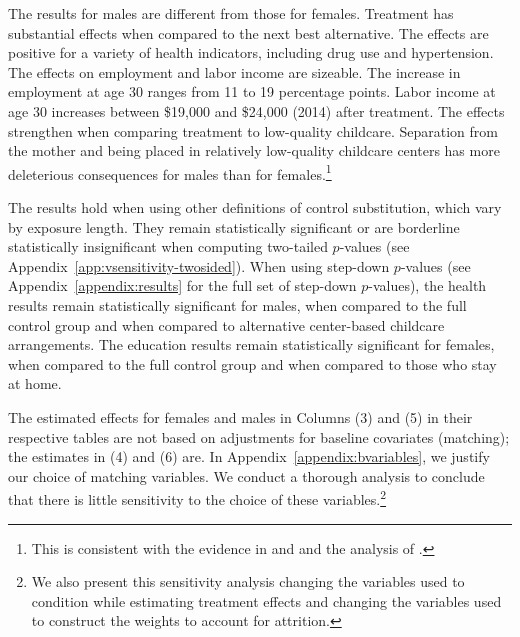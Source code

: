 The results for males are different from those for females. Treatment has substantial effects when compared to the next best alternative. The effects are positive for a variety of health indicators, including drug use and hypertension. The effects on employment and labor income are sizeable. The increase in employment at age 30 ranges from 11 to 19 percentage points. Labor income at age 30 increases between \$19,000 and \$24,000 (2014) after treatment. The effects strengthen when comparing treatment to low-quality childcare. Separation from the mother and being placed in relatively low-quality childcare centers has more deleterious consequences for males than for females.\footnote{This is consistent with the evidence in \citet{Baker_Gruber_Milligan_2015_Noncog_Defects} and \citet{Kottelenberg-Lehrer_2014_Gender-Effects} and the analysis of \citet{golding2016psychology}.}

The results hold when using other definitions of control substitution, which vary by exposure length. They remain statistically significant or are borderline statistically insignificant when computing two-tailed $p$-values (see Appendix~\ref{app:vsensitivity-twosided}). When using step-down $p$-values (see Appendix~\ref{appendix:results} for the full set of step-down $p$-values), the health results remain statistically significant for males, when compared to the full control group and when compared to alternative center-based childcare arrangements. The education results remain statistically significant for females, when compared to the full control group and when compared to those who stay at home.

The estimated effects for females and males in Columns (3) and (5) in their respective tables are not based on adjustments for baseline covariates (matching); the estimates in (4) and (6) are. In Appendix~\ref{appendix:bvariables}, we justify our choice of matching variables. We conduct a thorough analysis to conclude that there is little sensitivity to the choice of these variables.\footnote{We also present this sensitivity analysis changing the variables used to condition while estimating treatment effects and changing the variables used to construct the weights to account for attrition.}

